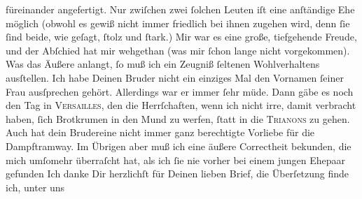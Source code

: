 \begin{ledgroupsized}[t]{13cm}
               füreinander angefertigt. Nur zwiſchen zwei ſolchen Leuten iſt eine anſtändige Ehe
               möglich (obwohl es gewiß nicht immer friedlich bei ihnen zugehen wird, denn ſie ſind
               beide, wie geſagt, ſtolz und ſtark.) {\pb}Mir war es
               eine große, tiefgehende Freude, und der Abſchied hat mir wehgethan (was mir ſchon
               lange nicht vorgekommen).\pend
           \pstart
           Was das Äußere anlangt, ſo muß ich ein Zeugniß ſeltenen Wohlverhaltens ausſtellen.
               Ich habe Deinen Bruder nicht
               ein einziges Mal den Vornamen ſeiner Frau ausſprechen gehört. Allerdings war er immer ſehr müde. Dann gäbe es
               noch den Tag in \textsc{Versailles}, den die Herrſchaften, wenn ich nicht irre, damit verbracht haben,
               ſich Brotkrumen in den Mund zu werfen, ſtatt in die \textsc{Trianons} zu gehen. Auch hat dein Brudereine nicht immer ganz berechtigte Vorliebe für die
               Dampftramway. Im Übrigen aber muß ich \strikeout{\textcolor{gray}{von}} eine\strikeout{\textcolor{gray}{r}} äußere\strikeout{\textcolor{gray}{n}} Correctheit bekunden, die mich umſomehr überraſcht
               hat, als ich ſie nie vorher bei einem jungen Ehepaar gefunden{\dotsfive}\pend
           \pstart
           Ich danke Dir herzlichſt für Deinen lieben Brief, die Überſetzung finde ich, unter uns

\end{ledgroupsized}
